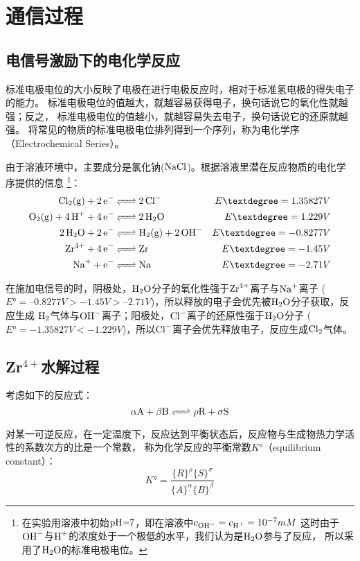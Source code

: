 \section{通信过程}
\subsection{电信号激励下的电化学反应}
标准电极电位的大小反映了电极在进行电极反应时，相对于标准氢电极的得失电子的能力。
标准电极电位的值越大，就越容易获得电子，换句话说它的氧化性就越强；反之，
标准电极电位的值越小，就越容易失去电子，换句话说它的还原就越强\cite{Trasatti1980}。
将常见的物质的标准电极电位排列得到一个序列，称为电化学序（Electrochemical Series）。

由于溶液环境中，主要成分是氯化钠($\ce{NaCl}$)。根据溶液里潜在反应物质的电化学序提供的信息\cite{Weik2001}
\footnote{在实验用溶液中初始$\ce{pH=7}$，即在溶液中$c_{\ce{OH-}}=c_{\ce{H+}}=10^{-7}mM$
这时由于$\ce{OH-}$与$\ce{H+}$的浓度处于一个极低的水平，我们认为是$\ce{H2O}$参与了反应，
所以采用了$\ce{H2O}$的标准电极电位。}：
\begin{align}
\label{equation:anode_reaction} \ce{Cl2(g) + 2e- &<=> 2 Cl-} \quad\quad\quad\quad &{E°}=1.35827V \\
\ce{O2(g) + 4H+ + 4 e- &<=> 2H2O} &{E°}=1.229V \\ 
\label{equation:cathode_reaction} \ce{2 H2O + 2 e- &<=> H2(g) + 2OH- } &{E°}=-0.8277V \\
\ce{Zr^4+ + 4e- &<=> Zr}   &{E°}=-1.45V \\
\ce{Na+ + e- &<=> Na }     &{E°}=-2.71V
\end{align}


在施加电信号的时，阴极处，$\ce{H2O}$分子的氧化性强于$\ce{Zr^4+}$离子与$\ce{Na+}$离子
($E°=–0.8277V>-1.45V>–2.71V$)，所以释放的电子会优先被$\ce{H2O}$分子获取，反应生成
$\ce{H2}$气体与$\ce{OH-}$离子；阳极处，$\ce{Cl-}$离子的还原性强于$\ce{H2O}$分子
($E°=-1.35827V<-1.229V$)，所以$\ce{Cl-}$离子会优先释放电子，反应生成$\ce{Cl2}$气体。

\subsection{Zr$^{4+}$水解过程}
考虑如下的反应式：
\begin{equation}
    \ce{\alpha{A} +\beta{B} <=> \rho{R} + \sigma{S}}
\end{equation}

对某一可逆反应，在一定温度下，反应达到平衡状态后，反应物与生成物热力学活性的系数次方的比是一个常数，
称为化学反应的平衡常数$K°$（equilibrium constant）：
\begin{equation}
    K°=\frac{\{R\}^\rho \{S\}^\sigma}{\{A\}^\alpha \{B\}^\beta}
\end{equation}

